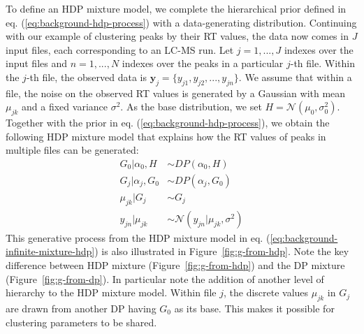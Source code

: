 To define an HDP mixture model, we complete the hierarchical prior defined in eq. (\ref{eq:background-hdp-process}) with a data-generating distribution. Continuing with our example of clustering peaks by their RT values, the data now comes in $J$ input files, each corresponding to an LC-MS run. Let $j=1,...,J$ indexes over the input files and $n=1,...,N$ indexes over the peaks in a particular $j$-th file. Within the $j$-th file, the observed data is $\boldsymbol{y}_j=\{y_{j1}, y_{j2}, ..., y_{jn}\}$. We assume that within a file, the noise on the observed RT values is generated by a Gaussian with mean $\mu_{jk}$ and a fixed variance $\sigma^2$. As the base distribution, we set $H=\mathcal{N}(\mu_0, \sigma_0^2)$. Together with the prior in eq. (\ref{eq:background-hdp-process}), we obtain the following HDP mixture model that explains how the RT values of peaks in multiple files can be generated:
\begin{equation}
\begin{aligned}
G_0 \vert \alpha_0, H &\sim DP(\alpha_0, H) \\
G_j \vert \alpha_j, G_0 &\sim DP(\alpha_j, G_0) \\
\mu_{jk} \vert G_j               &\sim G_j \\
y_{jn} \vert \mu_{jk}           &\sim \mathcal{N}(y_{jn} \vert \mu_{jk}, \sigma^2)
\end{aligned}
\label{eq:background-infinite-mixture-hdp}
\end{equation}
This generative process from the HDP mixture model in eq. (\ref{eq:background-infinite-mixture-hdp}) is also illustrated in Figure~\ref{fig:g-from-hdp}. Note the key difference between HDP mixture (Figure~\ref{fig:g-from-hdp}) and the DP mixture (Figure~\ref{fig:g-from-dp}). In particular note the addition of another level of hierarchy to the HDP mixture model. Within file $j$, the discrete values $\mu_{jk}$ in $G_{j}$ are drawn from another DP having $G_{0}$ as its base. This makes it possible for clustering parameters to be shared. 

